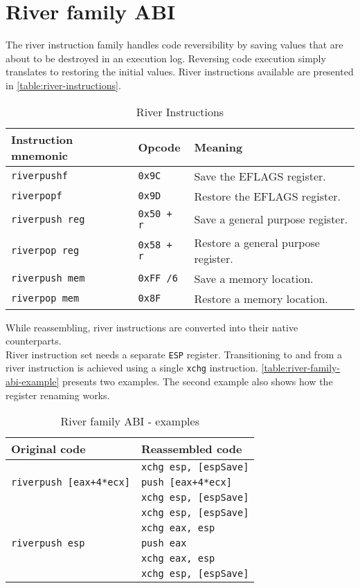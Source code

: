 \documentclass[12pt]{report}
\begin{document}
\section{River family ABI}
\label{sec:river-family-abi}
The river instruction family handles code reversibility by saving values that are about to be destroyed in an execution log. Reversing code execution simply translates to restoring the initial values. River instructions available are presented in \autoref{table:river-instructions}.\\
\begin{table}[H]
	\begin{tabular}{| l | l | l |}
		\hline
		\textbf{Instruction mnemonic} & \textbf{Opcode} & \textbf{Meaning} \\ \hline
		\texttt{riverpushf}  & \texttt{0x9C}  & Save the EFLAGS register.\\ \hline
		\texttt{riverpopf}  & \texttt{0x9D}  & Restore the EFLAGS register.\\ \hline
		\texttt{riverpush reg}  & \texttt{0x50 + r}  & Save a general purpose register.\\ \hline
		\texttt{riverpop reg}  & \texttt{0x58 + r}  & Restore a general purpose register.\\ \hline
		\texttt{riverpush mem}  & \texttt{0xFF /6}  & Save a memory location.\\ \hline
		\texttt{riverpop mem}  & \texttt{0x8F}  & Restore a memory location.\\ \hline
	\end{tabular}
	\caption{River Instructions}
	\label{table:river-instructions}
\end{table}
While reassembling, river instructions are converted into their native counterparts.\\
\newline
River instruction set needs a separate \texttt{ESP} register. Transitioning to and from a river instruction is achieved using a single \texttt{xchg} instruction. \autoref{table:river-family-abi-example} presents two examples. The second example also shows how the register renaming works.\\
\begin{table}[H]
	\centering
	\begin{tabular}{| l | l |}
		\hline
		\textbf{Original code} & \textbf{Reassembled code}\\ \hline
		\multirow{3}{*}{\texttt{riverpush [eax+4*ecx]}} & \texttt{xchg esp, [espSave]}\\
		& \texttt{push [eax+4*ecx]}\\
		& \texttt{xchg esp, [espSave]}\\ \hline
		\multirow{5}{*}{\texttt{riverpush esp}} & \texttt{xchg esp, [espSave]}\\
		& \texttt{xchg eax, esp}\\
		& \texttt{push eax}\\
		& \texttt{xchg eax, esp}\\
		& \texttt{xchg esp, [espSave]}\\ \hline
	\end{tabular}
	\caption{River family ABI - examples}
	\label{table:river-family-abi-example}
\end{table}
\end{document}
